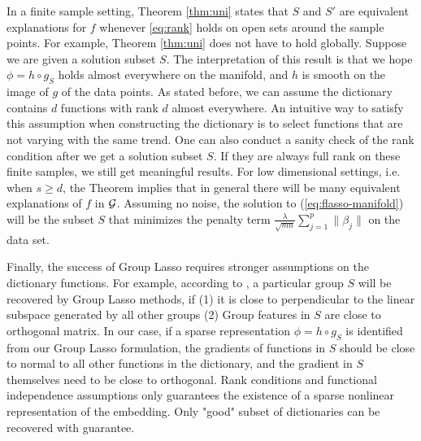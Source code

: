 In a finite sample setting, Theorem \ref{thm:uni} states that $S$ and $S'$ are equivalent explanations for $f$ whenever \eqref{eq:rank} holds on open sets around the sample points. For example, Theorem \ref{thm:uni} does not have to hold globally. Suppose we are given a solution subset $S$. The interpretation of this result is that we hope $\phi = h\circ g_{S}$ holds almost everywhere on the manifold, and $h$ is smooth on the image of $g$ of the data points. As stated before, we can assume the dictionary contains $d$ functions with rank $d$ almost everywhere. An intuitive way to satisfy this assumption when constructing the dictionary is to select functions that are not varying with the same trend. One can also conduct a sanity check of the rank condition after we get a solution subset $S$. If they are always full rank on these finite samples, we still get meaningful results.  For low dimensional settings, i.e. when $s\geq d$, the Theorem implies
that in general there will be many equivalent explanations of $f$ in
${\cal G}$. Assuming no noise, the solution to (\ref{eq:flasso-manifold}) will be the subset
$S$ that minimizes the penalty term
$\frac{\lambda}{\sqrt{mn}}\sum_{j=1}^p\|\beta_j\|$ on the data set. 

Finally, the success of Group Lasso requires stronger assumptions on the dictionary functions. For example, according to \cite{GO2011}, a particular group $S$ will be recovered by Group Lasso methods, if (1) it is close to perpendicular to the linear subspace generated by all other groups (2) Group features in $S$ are close to orthogonal matrix. In our case, if a sparse representation $\phi=h\circ g_S$ is identified from our Group Lasso formulation, the gradients of functions in $S$ should be close to normal to all other functions in the dictionary, and the gradient in $S$ themselves need to be close to orthogonal. Rank conditions and functional independence assumptions only guarantees the existence of a sparse nonlinear representation of the embedding. Only "good" subset of dictionaries can be recovered with guarantee. 


